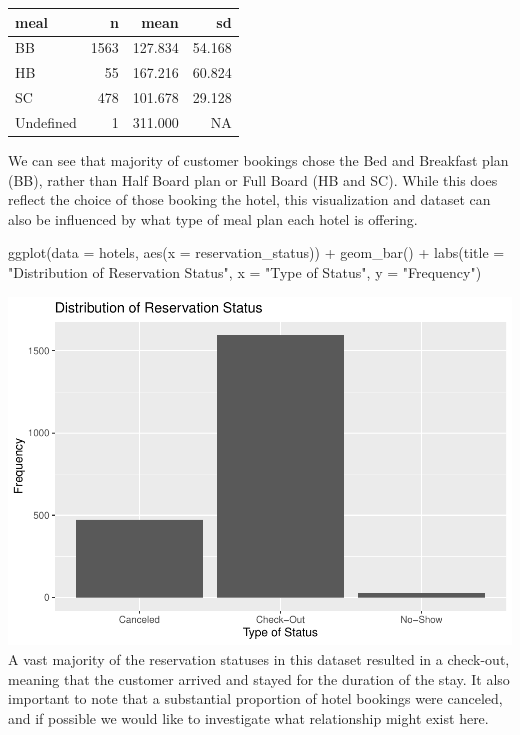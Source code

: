 \documentclass[
]{article}
\newenvironment{Shaded}{\begin{snugshade}}{\end{snugshade}}
\newcommand{\AttributeTok}[1]{\textcolor[rgb]{0.77,0.63,0.00}{#1}}
\newcommand{\FunctionTok}[1]{\textcolor[rgb]{0.00,0.00,0.00}{#1}}
\newcommand{\NormalTok}[1]{#1}
\newcommand{\SpecialCharTok}[1]{\textcolor[rgb]{0.00,0.00,0.00}{#1}}
\newcommand{\StringTok}[1]{\textcolor[rgb]{0.31,0.60,0.02}{#1}}
\begin{document}
\begin{longtable}[]{@{}lrrr@{}}
\toprule
meal & n & mean & sd \\
\midrule
\endhead
BB & 1563 & 127.834 & 54.168 \\
HB & 55 & 167.216 & 60.824 \\
SC & 478 & 101.678 & 29.128 \\
Undefined & 1 & 311.000 & NA \\
\bottomrule
\end{longtable}

We can see that majority of customer bookings chose the Bed and
Breakfast plan (BB), rather than Half Board plan or Full Board (HB and
SC). While this does reflect the choice of those booking the hotel, this
visualization and dataset can also be influenced by what type of meal
plan each hotel is offering.

\begin{Shaded}
\begin{Highlighting}[]
\FunctionTok{ggplot}\NormalTok{(}\AttributeTok{data =}\NormalTok{ hotels, }\FunctionTok{aes}\NormalTok{(}\AttributeTok{x =}\NormalTok{ reservation\_status)) }\SpecialCharTok{+}
\FunctionTok{geom\_bar}\NormalTok{() }\SpecialCharTok{+}
\FunctionTok{labs}\NormalTok{(}\AttributeTok{title =} \StringTok{"Distribution of Reservation Status"}\NormalTok{,}
  \AttributeTok{x =} \StringTok{"Type of Status"}\NormalTok{,}
  \AttributeTok{y =} \StringTok{"Frequency"}\NormalTok{) }
\end{Highlighting}
\end{Shaded}

\includegraphics{written_report_files/figure-latex/unnamed-chunk-4-1.pdf}
A vast majority of the reservation statuses in this dataset resulted in
a check-out, meaning that the customer arrived and stayed for the
duration of the stay. It also important to note that a substantial
proportion of hotel bookings were canceled, and if possible we would
like to investigate what relationship might exist here.
\end{document}
